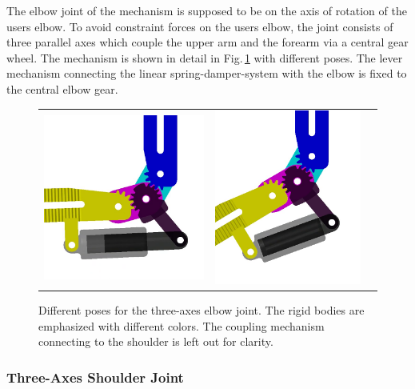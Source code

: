 \documentclass[letterpaper, 10 pt, conference]{ieeeconf}  %
\begin{document}
The elbow joint of the mechanism is supposed to be on the axis of rotation of the users elbow.
To avoid constraint forces on the users elbow, the joint consists of three parallel axes which couple the upper arm and the forearm via a central gear wheel. The mechanism is shown in detail in Fig.\,\ref{fig:EllenbogenSimMech} with different poses.
The lever mechanism connecting the linear spring-damper-system with the elbow is fixed to the central elbow gear.

\begin{figure}[tb!]
    \begin{tabular}{c c c}
        \includegraphics[height=0.5\linewidth]{figures/KAS6m3_SimMech_2.png} &
        \includegraphics[height=0.5\linewidth]{figures/KAS6m3_SimMech_3.png}
    \end{tabular}

    \caption{Different poses for the three-axes elbow joint. The rigid bodies are emphasized with different colors. The coupling mechanism connecting to the shoulder is left out for clarity.}
    \label{fig:EllenbogenSimMech}
\end{figure} 

\subsubsection{Three-Axes Shoulder Joint}
\end{document}
